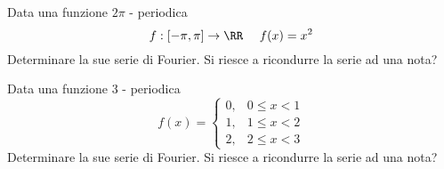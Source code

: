\ParteEsercizi

\Esercizio{}

Data una funzione $2\pi $ - periodica
\begin{equation*}
f:[ - \pi, \pi ]\rightarrow \RR \ \ \ \ f(x) = x^{2}
\end{equation*}
Determinare la sue serie di Fourier. Si riesce a ricondurre la serie ad una nota?

\Esercizio{}

Data una funzione $3$ - periodica
\begin{equation*}
f(x) =
\begin{cases}
0, & 0 \leq x < 1\\
1, & 1 \leq x < 2\\
2, & 2 \leq x < 3
\end{cases}
\end{equation*}
Determinare la sue serie di Fourier. Si riesce a ricondurre la serie ad una nota?

\Esercizio{}

